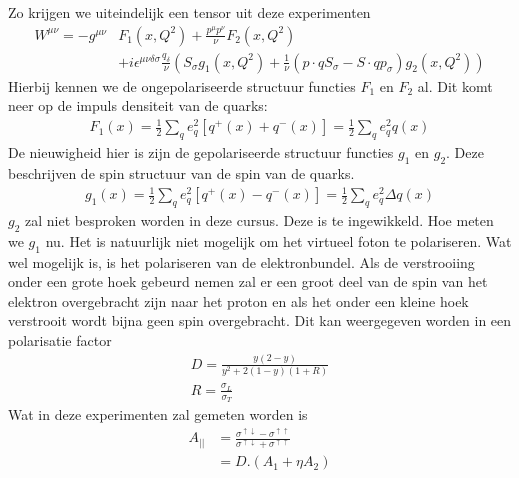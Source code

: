 \documentclass[../main.tex]{subfiles}
\begin{document}
Zo krijgen we uiteindelijk een tensor uit deze experimenten
\begin{equation}
    \begin{aligned}
        \label{eq:pol_tensor}
        W^{\mu\nu} = -g^{\mu\nu}&F_1(x,Q^2) + \frac{p^\mu p^\nu}{\nu} F_2(x,Q^2)\\
        &+ i\epsilon^{\mu\nu\delta\sigma} \frac{q_\delta}{\nu} (S_\sigma g_1(x,Q^2) + \frac{1}{\nu} (p\cdot qS_\sigma - S\cdot qp_\sigma)g_2(x,Q^2))
    \end{aligned}
\end{equation}
Hierbij kennen we de ongepolariseerde structuur functies $F_1$ en $F_2$ al. Dit komt neer op de impuls densiteit van de quarks:
\begin{equation}
    \begin{aligned}
        \label{eq:f_1_pol}
        F_1(x)=\frac{1}{2} \sum_q e_q^2[q^+(x)+q^-(x)] = \frac{1}{2} \sum_q e_q^2 q(x)
    \end{aligned}
\end{equation}
De nieuwigheid hier is zijn de gepolariseerde structuur functies $g_1$ en $g_2$. Deze beschrijven de spin structuur van de spin van de quarks.
\begin{equation}
    \begin{aligned}
        \label{eq:g_1_pol}
        g_1(x)=\frac{1}{2} \sum_q e_q^2[q^+(x)-q^-(x)] = \frac{1}{2} \sum_q e_q^2 \Delta q(x)
    \end{aligned}
\end{equation}
$g_2$ zal niet besproken worden in deze cursus. Deze is te ingewikkeld. Hoe meten we $g_1$ nu. Het is natuurlijk niet mogelijk om het virtueel foton te polariseren. Wat wel mogelijk is, is het polariseren van de elektronbundel. Als de verstrooiing onder een grote hoek gebeurd nemen zal er een groot deel van de spin van het elektron overgebracht zijn naar het proton en als het onder een kleine hoek verstrooit wordt bijna geen spin overgebracht. Dit kan weergegeven worden in een polarisatie factor
\begin{equation}
    \begin{aligned}
        \label{eq:pol_factor}
        D= \frac{y(2-y)}{y^2 + 2(1-y)(1+R)}\\
        R= \frac{\sigma_L}{\sigma_T} 
    \end{aligned}
\end{equation}
Wat in deze experimenten zal gemeten worden is
\begin{equation}
    \begin{aligned}
        \label{eq:a_parallel}
        A_{||} &= \frac{\sigma^{\uparrow\downarrow} - \sigma^{\uparrow\uparrow}}{\sigma^{\uparrow\downarrow} + \sigma^{\uparrow\uparrow}}\\
               &= D.(A_1+\eta A_2)
    \end{aligned}
\end{equation}
\end{document}

